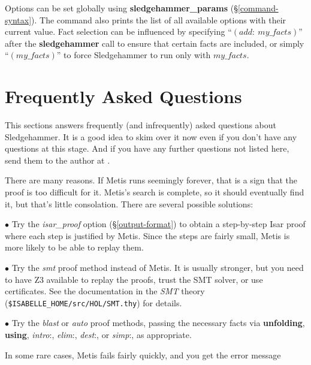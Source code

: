 \documentclass[a4paper,12pt]{article}
\begin{document}
Options can be set globally using \textbf{sledgehammer\_params}
(\S\ref{command-syntax}). The command also prints the list of all available
options with their current value. Fact selection can be influenced by specifying
``$(\textit{add}{:}~\textit{my\_facts})$'' after the \textbf{sledgehammer} call
to ensure that certain facts are included, or simply ``$(\textit{my\_facts})$''
to force Sledgehammer to run only with $\textit{my\_facts}$.

\section{Frequently Asked Questions}
\label{frequently-asked-questions}

This sections answers frequently (and infrequently) asked questions about
Sledgehammer. It is a good idea to skim over it now even if you don't have any
questions at this stage. And if you have any further questions not listed here,
send them to the author at \authoremail.


There are many reasons. If Metis runs seemingly forever, that is a sign that the
proof is too difficult for it. Metis's search is complete, so it should
eventually find it, but that's little consolation. There are several possible
solutions:

\begin{enum}
\item[$\bullet$] Try the \textit{isar\_proof} option (\S\ref{output-format}) to
obtain a step-by-step Isar proof where each step is justified by Metis. Since
the steps are fairly small, Metis is more likely to be able to replay them.

\item[$\bullet$] Try the \textit{smt} proof method instead of Metis. It is
usually stronger, but you need to have Z3 available to replay the proofs, trust
the SMT solver, or use certificates. See the documentation in the \emph{SMT}
theory (\texttt{\$ISABELLE\_HOME/src/HOL/SMT.thy}) for details.

\item[$\bullet$] Try the \textit{blast} or \textit{auto} proof methods, passing
the necessary facts via \textbf{unfolding}, \textbf{using}, \textit{intro}{:},
\textit{elim}{:}, \textit{dest}{:}, or \textit{simp}{:}, as appropriate.
\end{enum}

In some rare cases, Metis fails fairly quickly, and you get the error message
\end{document}
